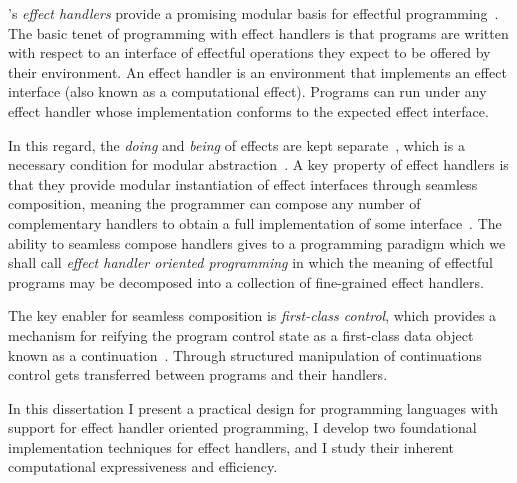 \documentclass[12pt,phd,lfcs,twoside,openright,logo,leftchapter,normalheadings]{infthesis}
\theoremstyle{plain}
\theoremstyle{definition}
\begin{document}
\citeauthor{PlotkinP09}'s \emph{effect handlers} provide a promising
modular basis for effectful
programming~\cite{PlotkinP09,PlotkinP13,KammarLO13}. The basic tenet
of programming with effect handlers is that programs are written with
respect to an interface of effectful operations they expect to be
offered by their environment.
%
An effect handler is an environment that implements an effect
interface (also known as a computational effect).
%
Programs can run under any effect handler whose implementation
conforms to the expected effect interface.
%

In this regard, the \emph{doing} and \emph{being} of effects are kept
separate~\cite{JonesW93,LindleyMM17}, which is a necessary condition
for modular abstraction~\cite{Parnas72}.
%
A key property of effect handlers is that they provide modular
instantiation of effect interfaces through seamless composition,
meaning the programmer can compose any number of complementary
handlers to obtain a full implementation of some
interface~\cite{HillerstromL16}.
%
The ability to seamless compose handlers gives to a programming
paradigm which we shall call \emph{effect handler oriented
  programming} in which the meaning of effectful programs may be
decomposed into a collection of fine-grained effect handlers.

The key enabler for seamless composition is \emph{first-class
  control}, which provides a mechanism for reifying the program
control state as a first-class data object known as a
continuation~\cite{FriedmanHK84}.
%
Through structured manipulation of continuations control gets
transferred between programs and their handlers.

In this dissertation I present a practical design for programming
languages with support for effect handler oriented programming, I
develop two foundational implementation techniques for effect
handlers, and I study their inherent computational expressiveness and
efficiency.


%
\end{document}
